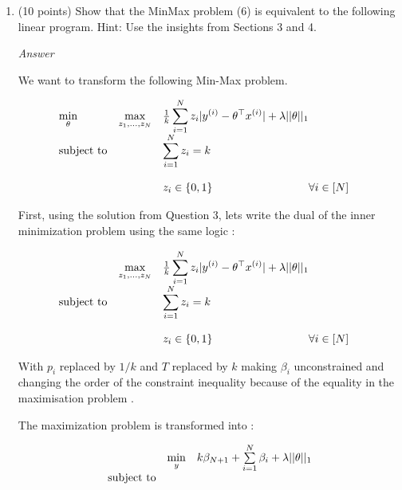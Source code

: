 \documentclass[10pt]{article}
\newenvironment{exercise}[2][Exercise]{\begin{trivlist}
  \item[\hskip \labelsep {\bfseries #1}\hskip \labelsep {\bfseries #2.}]}{\end{trivlist}}
\begin{document}
 
\begin{exercise}{7}

\begin{enumerate}
    \item (10 points) Show that the MinMax problem (6) is equivalent to the following linear program. Hint: Use the insights from Sections 3 and 4.
    
\textit{Answer}

We want to transform the following Min-Max problem. 

\begin{equation*}
\begin{array}{lll@{}lll}
\min\limits_{\theta}&\max\limits_{z_1,...,z_N}  &\frac{1}{k}\displaystyle\sum\limits_{i=1}^{N}z_i|y^{(i)} - \theta^\top x^{(i)}| +  \lambda||\theta||_1 &\\
\text{subject to} 
&& \displaystyle\sum\limits_{i=1}^{N}z_i = k  && \\
                \\
                && z_i \in  \{ 0, 1 \}   & \forall i \in [ N ]& 
\end{array}
\end{equation*}


First, using the solution from Question 3, lets write the dual of the inner minimization problem using the same logic : 


\begin{equation*}
\begin{array}{lll@{}lll}
&\max\limits_{z_1,...,z_N}  &\frac{1}{k}\displaystyle\sum\limits_{i=1}^{N}z_i|y^{(i)} - \theta^\top x^{(i)}| +  \lambda||\theta||_1 &\\
\text{subject to} 
&& \displaystyle\sum\limits_{i=1}^{N}z_i = k  &&  \\
                \\
                && z_i \in  \{ 0, 1 \}   & \forall i \in [ N ]& 
\end{array}
\end{equation*}

With $p_i$  replaced by $ 1 / k$ and $T$ replaced by $k$ making  $\beta_i$  unconstrained and changing the order of the constraint inequality because of the equality in the maximisation problem  . 

The maximization problem is transformed into : 

\begin{equation*}
\begin{array}{lll@{}lll}
&\min\limits_{y}   &  k\beta_{N + 1 }  + \sum\limits_{i=1}^{N}\beta_i  + \lambda||\theta||_1  &\\
\text{subject to} 


\end{array}
\end{equation*}
\end{enumerate}
\end{exercise}
\end{document}
